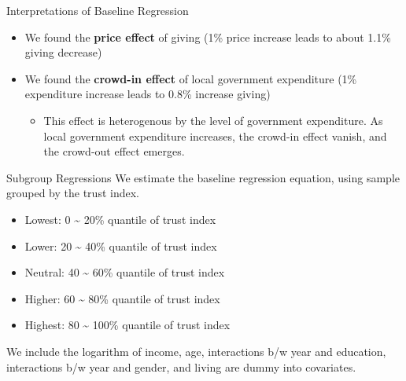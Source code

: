 \documentclass[
  ignorenonframetext,
]{beamer}
\providecommand{\tightlist}{%
  \setlength{\itemsep}{0pt}\setlength{\parskip}{0pt}}
\begin{document}
\begin{frame}{Interpretations of Baseline Regression}
\protect\hypertarget{interpretations-of-baseline-regression}{}
\begin{itemize}
\tightlist
\item
  We found the \textbf{price effect} of giving (1\% price increase leads
  to about 1.1\% giving decrease)
\item
  We found the \textbf{crowd-in effect} of local government expenditure
  (1\% expenditure increase leads to 0.8\% increase giving)

  \begin{itemize}
  \tightlist
  \item
    This effect is heterogenous by the level of government expenditure.
    As local government expenditure increases, the crowd-in effect
    vanish, and the crowd-out effect emerges.
  \end{itemize}
\end{itemize}
\end{frame}

\begin{frame}{Subgroup Regressions}
\protect\hypertarget{subgroup-regressions}{}
We estimate the baseline regression equation, using sample grouped by
the trust index.

\begin{itemize}
\tightlist
\item
  Lowest: 0 \textasciitilde{} 20\% quantile of trust index
\item
  Lower: 20 \textasciitilde{} 40\% quantile of trust index
\item
  Neutral: 40 \textasciitilde{} 60\% quantile of trust index
\item
  Higher: 60 \textasciitilde{} 80\% quantile of trust index
\item
  Highest: 80 \textasciitilde{} 100\% quantile of trust index
\end{itemize}

We include the logarithm of income, age, interactions b/w year and
education, interactions b/w year and gender, and living are dummy into
covariates.
\end{frame}
\end{document}
